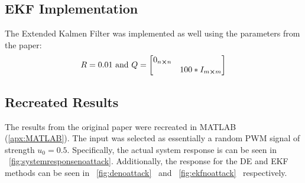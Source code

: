 \documentclass[]{ieeetran}
\begin{document}
\subsection{EKF Implementation}
The Extended Kalmen Filter was implemented as well using the parameters from the paper:
\begin{displaymath}
	R = 0.01 \text{ and } Q = \mqty[0_{n\cross n} & \\ & 100 * I_{m \cross m}]
\end{displaymath}






\subsection{Recreated Results}
The results from the original paper were recreated in MATLAB (\appendixname \ref{apx:MATLAB}). The input was selected as essentially a random PWM signal of strength $u_0 = 0.5$.
Specifically, the actual system response is can be seen in \figurename \ \ref{fig:systemresponsenoattack}. Additionally, the response for the DE and EKF methods can be seen in \figurename \ \ref{fig:denoattack} \ and \figurename \ \ref{fig:ekfnoattack} \ respectively.
\end{document}
